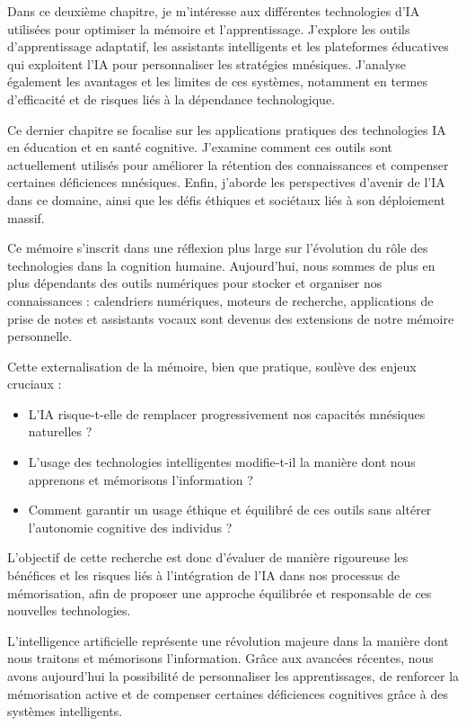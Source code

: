 \documentclass[12pt,a4paper]{report}
\begin{document}
Dans ce deuxième chapitre, je m'intéresse aux différentes technologies d’IA utilisées pour optimiser la mémoire et l’apprentissage. J'explore les outils d’apprentissage adaptatif, les assistants intelligents et les plateformes éducatives qui exploitent l’IA pour personnaliser les stratégies mnésiques. J'analyse également les avantages et les limites de ces systèmes, notamment en termes d’efficacité et de risques liés à la dépendance technologique.

Ce dernier chapitre se focalise sur les applications pratiques des technologies IA en éducation et en santé cognitive. J'examine comment ces outils sont actuellement utilisés pour améliorer la rétention des connaissances et compenser certaines déficiences mnésiques. Enfin, j'aborde les perspectives d’avenir de l’IA dans ce domaine, ainsi que les défis éthiques et sociétaux liés à son déploiement massif.

Ce mémoire s’inscrit dans une réflexion plus large sur l’évolution du rôle des technologies dans la cognition humaine. Aujourd’hui, nous sommes de plus en plus dépendants des outils numériques pour stocker et organiser nos connaissances : calendriers numériques, moteurs de recherche, applications de prise de notes et assistants vocaux sont devenus des extensions de notre mémoire personnelle.

Cette externalisation de la mémoire, bien que pratique, soulève des enjeux cruciaux :
\begin{itemize}

    \item L’IA risque-t-elle de remplacer progressivement nos capacités mnésiques naturelles ?
    
    \item L’usage des technologies intelligentes modifie-t-il la manière dont nous apprenons et mémorisons l’information ?

    \item Comment garantir un usage éthique et équilibré de ces outils sans altérer l’autonomie cognitive des individus ?

\end{itemize}

L’objectif de cette recherche est donc d’évaluer de manière rigoureuse les bénéfices et les risques liés à l’intégration de l’IA dans nos processus de mémorisation, afin de proposer une approche équilibrée et responsable de ces nouvelles technologies.

L’intelligence artificielle représente une révolution majeure dans la manière dont nous traitons et mémorisons l’information. Grâce aux avancées récentes, nous avons aujourd’hui la possibilité de personnaliser les apprentissages, de renforcer la mémorisation active et de compenser certaines déficiences cognitives grâce à des systèmes intelligents.
\end{document}
